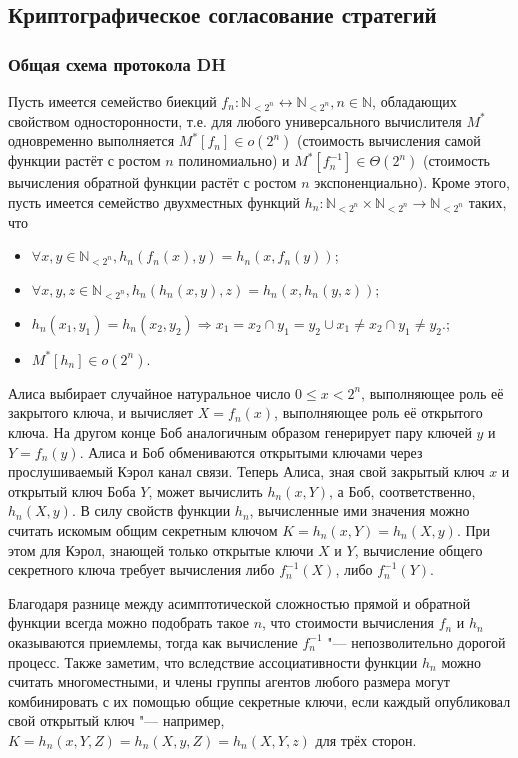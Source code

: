 \subsection{Криптографическое согласование стратегий}

\begin{frame}[allowframebreaks]
	\frametitle{Общая схема протокола DH}
	Пусть имеется семейство биекций $f_n: \mathbb{N}_{<2^n} \leftrightarrow \mathbb{N}_{<2^n}, n \in \mathbb{N}$, обладающих свойством односторонности, т.е. для любого универсального вычислителя $M^*$ одновременно выполняется $M^*[f_n] \in o(2^n)$ (стоимость вычисления самой функции растёт с ростом $n$ полиномиально) и $M^*[f_n^{-1}] \in \Theta(2^n)$ (стоимость вычисления обратной функции растёт с ростом $n$ экспоненциально). Кроме этого, пусть имеется семейство двухместных функций $h_n : \mathbb{N}_{<2^n} \times \mathbb{N}_{<2^n} \rightarrow \mathbb{N}_{<2^n}$ таких, что
	\begin{itemize}
		\item $\forall x, y \in \mathbb{N}_{<2^n}, h_n(f_n(x), y) = h_n(x, f_n(y))$;
		\item $\forall x, y, z \in \mathbb{N}_{<2^n}, h_n(h_n(x, y), z) = h_n(x, h_n(y, z))$;
		\item $h_n(x_1, y_1) = h_n(x_2, y_2) \Rightarrow x_1 = x_2 \cap y_1 = y_2 \cup x_1 \neq x_2 \cap y_1 \neq y_2$.;
		\item $M^*[h_n] \in o(2^n)$.
	\end{itemize}
	\framebreak
	Алиса выбирает случайное натуральное число $0 \le x < 2^n$, выполняющее роль её закрытого ключа, и вычисляет $X = f_n(x)$, выполняющее роль её открытого ключа. На другом конце Боб аналогичным образом генерирует пару ключей $y$ и $Y = f_n(y)$. Алиса и Боб обмениваются открытыми ключами через прослушиваемый Кэрол канал связи. Теперь Алиса, зная свой закрытый ключ $x$ и открытый ключ Боба $Y$, может вычислить $h_n(x, Y)$, а Боб, соответственно, $h_n(X, y)$. В силу свойств функции $h_n$, вычисленные ими значения можно считать искомым общим секретным ключом $K = h_n(x, Y) = h_n(X, y)$. При этом для Кэрол, знающей только открытые ключи $X$ и $Y$, вычисление общего секретного ключа требует вычисления либо $f_n^{-1}(X)$, либо $f_n^{-1}(Y)$.
	
	\framebreak
	
	Благодаря разнице между асимптотической сложностью прямой и обратной функции всегда можно подобрать такое $n$, что стоимости вычисления $f_n$ и $h_n$ оказываются приемлемы, тогда как вычисление $f_n^{-1}$ "--- непозволительно дорогой процесс. Также заметим, что вследствие ассоциативности функции $h_n$ можно считать многоместными, и члены группы агентов любого размера могут комбинировать с их помощью общие секретные ключи, если каждый опубликовал свой открытый ключ "--- например, $K = h_n(x, Y, Z) = h_n(X, y, Z) = h_n(X, Y, z)$ для трёх сторон.
\end{frame}

